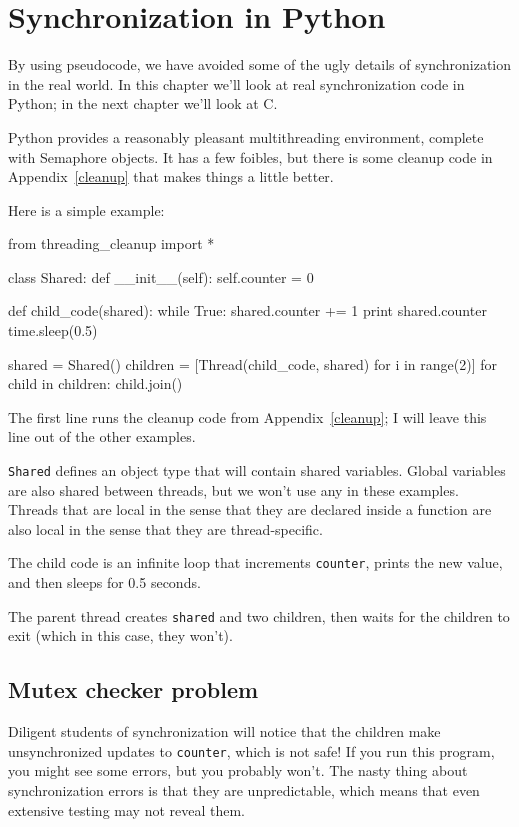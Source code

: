 \documentclass{book}
\begin{document}
\chapter{Synchronization in Python}
\label{pysync}

By using pseudocode, we have avoided some of the ugly
details of synchronization in the real world.  In this chapter
we'll look at real synchronization code in Python; in the
next chapter we'll look at C.

Python provides a reasonably pleasant multithreading environment,
complete with Semaphore objects.  It has
a few foibles, but there is some cleanup code in Appendix~\ref{cleanup}
that makes things a little better.

Here is a simple example:

\begin{unbreakable}[title={}]{}
from threading_cleanup import *

class Shared:
    def __init__(self):
        self.counter = 0

def child_code(shared):
    while True:
        shared.counter += 1
        print shared.counter
        time.sleep(0.5)

shared = Shared()
children = [Thread(child_code, shared) 
  for i in range(2)]
for child in children: child.join()
\end{unbreakable}

The first line runs the cleanup code from Appendix~\ref{cleanup};
I will leave this line out of the other examples.

    {\tt Shared} defines an object type that will contain shared variables.
Global variables are also shared between threads, but we won't
use any in these examples.  Threads that are local in the sense
that they are declared inside a function are also local in the
sense that they are thread-specific.

The child code is an infinite loop that increments {\tt counter},
prints the new value, and then sleeps for 0.5 seconds.

The parent thread creates {\tt shared} and two children,
then waits for the children to exit (which in this case, they won't).

\section{Mutex checker problem}

Diligent students of synchronization will notice that the
children make unsynchronized updates to {\tt counter}, which
is not safe!  If you run this program, you might see some
errors, but you probably won't.  The nasty thing about synchronization
errors is that they are unpredictable, which means that even
extensive testing may not reveal them.
\end{document}
